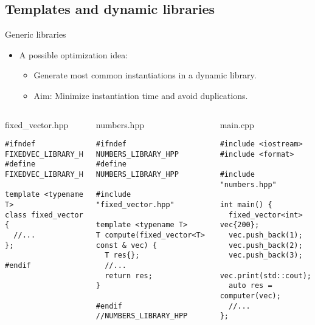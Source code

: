 \subsection{Templates and dynamic libraries}

\begin{frame}[t,fragile]{Generic libraries}
\begin{itemize}
  \item A possible optimization idea:
    \begin{itemize}
      \item Generate most common instantiations in a dynamic library.
      \item Aim: Minimize instantiation time and avoid duplications.
    \end{itemize}
\end{itemize}

\begin{columns}[T]

\begin{block}{fixed\_vector.hpp}
\begin{lstlisting}[basicstyle=\mode<presentation>{\tiny}]
#ifndef FIXEDVEC_LIBRARY_H
#define FIXEDVEC_LIBRARY_H

template <typename T>
class fixed_vector {
  //...
};

#endif
\end{lstlisting}
\end{block}


\begin{block}{numbers.hpp}
\begin{lstlisting}[basicstyle=\mode<presentation>{\tiny}]
#ifndef NUMBERS_LIBRARY_HPP
#define NUMBERS_LIBRARY_HPP

#include "fixed_vector.hpp"

template <typename T>
T compute(fixed_vector<T> const & vec) {
  T res{};
  //...
  return res;
}

#endif //NUMBERS_LIBRARY_HPP

\end{lstlisting}
\end{block}

\begin{block}{main.cpp}
\begin{lstlisting}[basicstyle=\mode<presentation>{\tiny}]
#include <iostream>
#include <format>

#include "numbers.hpp"

int main() {
  fixed_vector<int> vec{200};
  vec.push_back(1);
  vec.push_back(2);
  vec.push_back(3);
  vec.print(std::cout);
  auto res = computer(vec);
  //...
};
\end{lstlisting}
\end{block}
\end{columns}
\end{frame}

